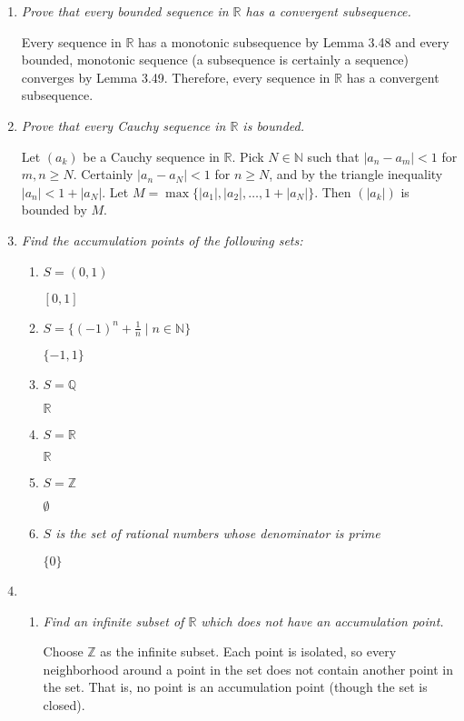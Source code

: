 \documentclass[11pt]{article}
\begin{document}
\begin{enumerate}
\item \emph{Prove that every bounded sequence in $\mathbb{R}$ has a convergent subsequence.}

Every sequence in $\mathbb{R}$ has a monotonic subsequence by Lemma 3.48 and every bounded, monotonic sequence (a subsequence is certainly a sequence) converges by Lemma 3.49.  Therefore, every sequence in $\mathbb{R}$ has a convergent subsequence.

\item \emph{Prove that every Cauchy sequence in $\mathbb{R}$ is bounded.}

Let $(a_k)$ be a Cauchy sequence in $\mathbb{R}$.  Pick $N \in \mathbb{N}$ such that $|a_n - a_m| < 1$ for $m,n \geq N$.  Certainly $|a_n - a_N| < 1$ for $n \geq N$, and by the triangle inequality $|a_n| < 1 + |a_N|$.  Let $M = \max\{|a_1|,|a_2|,\ldots,1+|a_N|\}$.  Then $(|a_k|)$ is bounded by $M$.

\item \emph{Find the accumulation points of the following sets:}
\begin{enumerate}
\item \emph{$S=(0,1)$}

$[0,1]$
\item \emph{$S = \{(-1)^n + \frac{1}{n}\mid n \in \mathbb{N}\}$}

$\{-1,1\}$

\item \emph{$S = \mathbb{Q}$}

$\mathbb{R}$
\item \emph{$S = \mathbb{R}$}

$\mathbb{R}$
\item \emph{$S = \mathbb{Z}$}

$\emptyset$
\item \emph{$S$ is the set of rational numbers whose denominator is prime}

$\{0\}$
\end{enumerate}

\item
\begin{enumerate}
\item \emph{Find an infinite subset of $\mathbb{R}$ which does not have an accumulation point.}

Choose $\mathbb{Z}$ as the infinite subset.  Each point is isolated, so every neighborhood around a point in the set does not contain another point in the set.  That is, no point is an accumulation point (though the set is closed).


\end{enumerate}
\end{enumerate}
\end{document}
